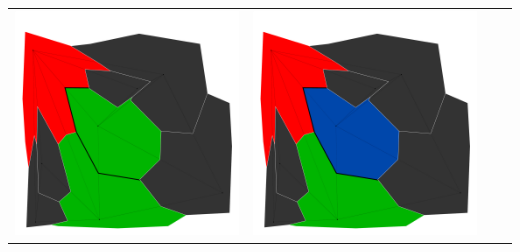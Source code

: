 \documentclass[10pt,a4paper]{article}
\begin{document}
\begin{tabular}{c c c c }
	\includegraphics[scale=.10]{../results/backtracking_simple/map_build/bt_simple_I00005.pdf}&
	\includegraphics[scale=.10]{../results/backtracking_simple/map_build/bt_simple_I00006.pdf}&

\end{tabular}
\end{document}
